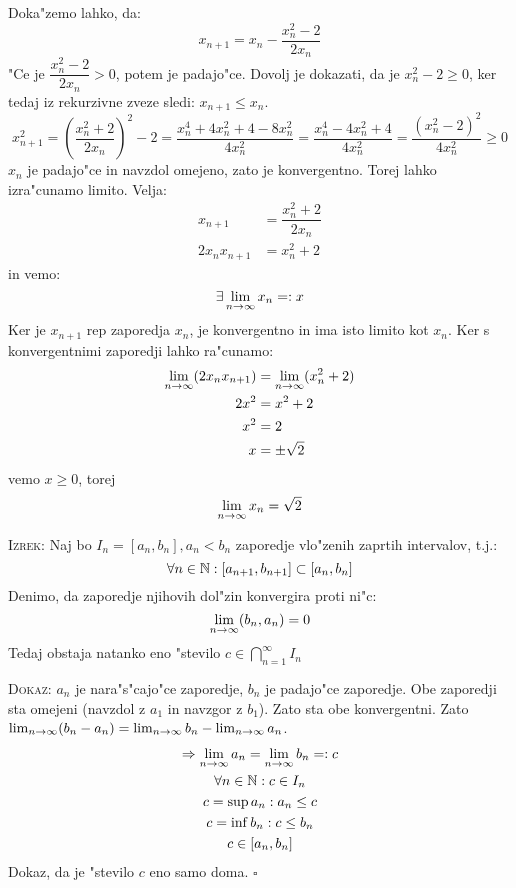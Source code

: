 Doka"zemo lahko, da: 
\begin{equation*}
x_{n+1} = x_n - \dfrac{x_n^2 - 2}{2x_n}
\end{equation*}
"Ce je $\dfrac{x_n^2 - 2}{2x_n} > 0$, potem je padajo"ce. Dovolj je dokazati, da je $x_n^2 - 2 \geq 0$, ker tedaj iz rekurzivne zveze sledi: $x_{n+1} \leq x_n$.
\begin{equation*}
x_{n+1}^2 = \left(\dfrac{x_n^2 + 2}{2x_n}\right)^2 - 2 = \dfrac{x_n^4 + 4x_n^2 + 4 - 8x_n^2}{4x_n^2} = \dfrac{x_n^4 - 4x_n^2 + 4}{4x_n^2} = \dfrac{(x_n^2 - 2)^2}{4x_n^2} \geq 0
\end{equation*}
$x_n$ je padajo"ce in navzdol omejeno, zato je konvergentno. Torej lahko izra"cunamo limito. Velja:
\begin{align*}
x_{n+1} &= \dfrac{x_n^2 + 2}{2x_n} \\
2x_n x_{n+1} &= x_n^2 + 2
\end{align*}
in vemo: 
\begin{equation*}
\exists \lim_{n \rightarrow \infty} x_n =: x
\end{equation*}
Ker je $x_{n+1}$ rep zaporedja $x_n$, je konvergentno in ima isto limito kot $x_n$. Ker s konvergentnimi zaporedji lahko ra"cunamo:
\begin{align*}
\lim_{n \rightarrow \infty} (2x_n x_{n+1}) & = \lim_{n \rightarrow \infty} (x_n^2 + 2) \\
2x^2 &= x^2 + 2 \\
x^2 &= 2\\
x &= \pm \sqrt{2}
\end{align*}
vemo $x \geq 0$, torej 
\begin{equation*}
\lim_{n \rightarrow \infty} x_n = \sqrt{2}
\end{equation*}

\textsc{Izrek:} Naj bo $I_n = [a_n, b_n], a_n < b_n$ zaporedje vlo"zenih zaprtih intervalov, t.j.:
\begin{equation*}
\forall n \in \mathbb{N}: [a_{n+1}, b_{n+1}] \subset [a_n, b_n]
\end{equation*}
Denimo, da zaporedje njihovih dol"zin konvergira proti ni"c:
\begin{equation*}
\lim_{n \rightarrow \infty} (b_n, a_n) = 0
\end{equation*}
Tedaj obstaja natanko eno "stevilo $c \in \bigcap_{n=1}^{\infty} I_n$

\textsc{Dokaz:} $a_n$ je nara"s"cajo"ce zaporedje, $b_n$ je padajo"ce zaporedje. Obe zaporedji sta omejeni (navzdol z $a_1$ in navzgor z $b_1$). Zato sta obe konvergentni. Zato $\lim_{n \rightarrow \infty} (b_n - a_n) = \lim_{n \rightarrow \infty} b_n - \lim_{n \rightarrow \infty} a_n$.
\begin{gather*}
\Rightarrow \lim_{n \rightarrow \infty} a_n = \lim_{n \rightarrow \infty} b_n =: c \\
\forall n \in \mathbb{N}: c \in I_n \\
c = \sup a_n: a_n \leq c\\
c = \inf b_n: c \leq b_n \\
c \in [a_n, b_n]
\end{gather*}
Dokaz, da je "stevilo $c$ eno samo doma. \hfill $\square$

